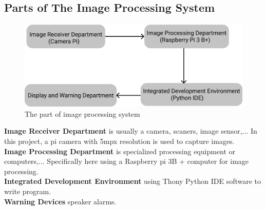     \subsection{Parts of The Image Processing System}
        \begin{figure}[H]
            \centering
            \includegraphics[width=0.6\linewidth]{img/Drowsiness.png}
            \caption{The part of image processing system}
        \end{figure}
        \textbf{Image Receiver Department} is usually a camera, scaners, image sensor,... In this project, a pi camera with 5mpx resolution is used to capture images. \\ 
        \vspace{3mm}
        \textbf{Image Processing Department} is specialized processing equipment or computers,... Specifically here using a Raspberry pi 3B + computer for image processing. \\ 
        \vspace{3mm}
        \textbf{Integrated Development Environment} using Thony Python IDE software to write program. \\ 
        \vspace{3mm}
        \textbf{Warning Devices} speaker alarms.

